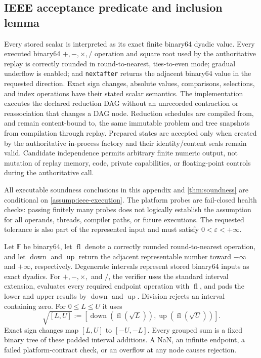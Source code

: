 \subsection{IEEE acceptance predicate and inclusion lemma}
\label{app:ieee-predicate}

\begin{assumption}
\label{assump:ieee-execution}
Every stored scalar is interpreted as its exact finite binary64 dyadic value.
Every executed binary64 $+,-,\times,/$ operation and square root used by the
authoritative replay is correctly rounded in round-to-nearest, ties-to-even
mode; gradual underflow is enabled; and \texttt{nextafter} returns the adjacent
binary64 value in the requested direction.  Exact sign changes, absolute
values, comparisons, selections, and index operations have their stated scalar
semantics.  The implementation executes the declared reduction DAG without an
unrecorded contraction or reassociation that changes a DAG node.  Reduction
schedules are compiled from, and remain content-bound to, the same immutable
problem and tree snapshots from compilation through replay.  Prepared states
are accepted only when created by the authoritative in-process factory and
their identity/content seals remain valid.  Candidate independence permits
arbitrary finite numeric output, not mutation of replay memory, code, private
capabilities, or floating-point controls during the authoritative call.
\end{assumption}

All executable soundness conclusions in this appendix and
\cref{thm:soundness} are conditional on
\cref{assump:ieee-execution}.  The platform probes are fail-closed health
checks: passing finitely many probes does not logically establish the
assumption for all operands, threads, compiler paths, or future executions.
The requested tolerance is also part of the represented input and must satisfy
$0<\varepsilon<+\infty$.

Let $\mathbb F$ be binary64, let $\operatorname{fl}$ denote a correctly rounded
round-to-nearest operation, and let $\operatorname{down}$ and
$\operatorname{up}$ return the adjacent representable number toward
$-\infty$ and $+\infty$, respectively.  Degenerate intervals represent stored
binary64 inputs as exact dyadics.  For $+,-,\times,$ and $/$, the verifier uses
the standard interval extension, evaluates every required endpoint operation
with $\operatorname{fl}$, and pads the lower and upper results by
$\operatorname{down}$ and $\operatorname{up}$.  Division rejects an interval
containing zero.  For $0\le L\le U$ it uses
\begin{equation}
 \sqrt{[L,U]}:=
 \left[\operatorname{down}(\operatorname{fl}(\sqrt L)),
       \operatorname{up}(\operatorname{fl}(\sqrt U))\right].
 \label{eq:ieee-sqrt}
\end{equation}
Exact sign changes map $[L,U]$ to $[-U,-L]$.  Every grouped sum is a fixed
binary tree of these padded interval additions.  A NaN, an infinite endpoint,
a failed platform-contract check, or an overflow at any node causes rejection.

